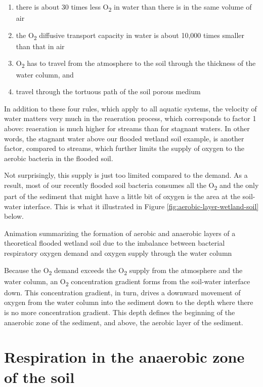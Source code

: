 \documentclass[]{book}
\providecommand{\tightlist}{%
  \setlength{\itemsep}{0pt}\setlength{\parskip}{0pt}}
\theoremstyle{definition}
\theoremstyle{definition}
\theoremstyle{definition}
\theoremstyle{remark}
\begin{document}
\begin{enumerate}
\def\labelenumi{\arabic{enumi}.}
\tightlist
\item
  there is about 30 times less O\textsubscript{2} in water than there is
  in the same volume of air
\item
  the O\textsubscript{2} diffusive transport capacity in water is about
  10,000 times smaller than that in air
\item
  O\textsubscript{2} has to travel from the atmosphere to the soil
  through the thickness of the water column, and
\item
  travel through the tortuous path of the soil porous medium
\end{enumerate}

In addition to these four rules, which apply to all aquatic systems, the
velocity of water matters very much in the reaeration process, which
corresponds to factor 1 above: reaeration is much higher for streams
than for stagnant waters. In other words, the stagnant water above our
flooded wetland soil example, is another factor, compared to streams,
which further limits the supply of oxygen to the aerobic bacteria in the
flooded soil.

Not surprisingly, this supply is just too limited compared to the
demand. As a result, most of our recently flooded soil bacteria consumes
all the O\textsubscript{2} and the only part of the sediment that might
have a little bit of oxygen is the area at the soil-water interface.
This is what it illustrated in Figure
\ref{fig:aerobic-layer-wetland-soil} below.

\label{fig:aerobic-layer-wetland-soil}Animation summarizing the formation of
aerobic and anaerobic layers of a theoretical flooded wetland soil due
to the imbalance between bacterial respiratory oxygen demand and oxygen
supply through the water column

Because the O\textsubscript{2} demand exceeds the O\textsubscript{2}
supply from the atmosphere and the water column, an O\textsubscript{2}
concentration gradient forms from the soil-water interface down. This
concentration gradient, in turn, drives a downward movement of oxygen
from the water column into the sediment down to the depth where there is
no more concentration gradient. This depth defines the beginning of the
anaerobic zone of the sediment, and above, the aerobic layer of the
sediment.

\section{Respiration in the anaerobic zone of the
soil}\label{respiration-in-the-anaerobic-zone-of-the-soil}
\end{document}
